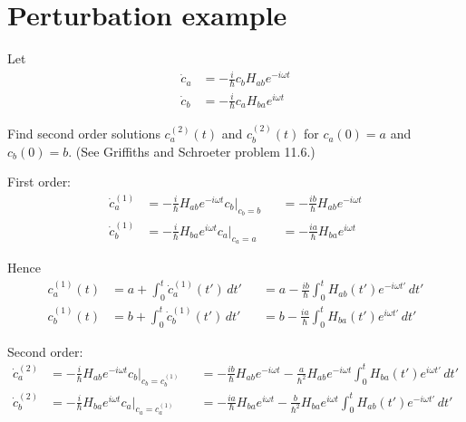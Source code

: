 

\section*{Perturbation example}

Let
\begin{equation*}
\begin{aligned}
\dot c_a&=-\frac{i}{\hbar}c_bH_{ab}e^{-i\omega t}
\\
\dot c_b&=-\frac{i}{\hbar}c_aH_{ba}e^{i\omega t}
\end{aligned}
\end{equation*}

Find second order solutions $c_a^{(2)}(t)$ and $c_b^{(2)}(t)$ for $c_a(0)=a$ and $c_b(0)=b$.
(See Griffiths and Schroeter problem 11.6.)

\bigskip
First order:
\begin{equation*}
\begin{aligned}
\dot c_a^{(1)}&=-\frac{i}{\hbar}H_{ab}e^{-i\omega t}c_b\bigg|_{c_b=b}
&&=-\frac{ib}{\hbar}H_{ab}e^{-i\omega t}
\\
\dot c_b^{(1)}&=-\frac{i}{\hbar}H_{ba}e^{i\omega t}c_a\bigg|_{c_a=a}
&&=-\frac{ia}{\hbar}H_{ba}e^{i\omega t}
\end{aligned}
\tag{1}
\end{equation*}

Hence
\begin{equation*}
\begin{aligned}
c_a^{(1)}(t)&=a+\int_0^t\dot c_a^{(1)}(t')\,dt'
&&=a-\frac{ib}{\hbar}\int_0^tH_{ab}(t')e^{-i\omega t'}\,dt'
\\
c_b^{(1)}(t)&=b+\int_0^t\dot c_b^{(1)}(t')\,dt'
&&=b-\frac{ia}{\hbar}\int_0^tH_{ba}(t')e^{i\omega t'}\,dt'
\end{aligned}
\tag{2}
\end{equation*}

Second order:
\begin{equation*}
\begin{aligned}
\dot c_a^{(2)}&=-\frac{i}{\hbar}H_{ab}e^{-i\omega t}c_b\bigg|_{c_b=c_b^{(1)}}
&&=-\frac{ib}{\hbar}H_{ab}e^{-i\omega t}-\frac{a}{\hbar^2}H_{ab}e^{-i\omega t}
\int_0^tH_{ba}(t')e^{i\omega t'}\,dt'
\\
\dot c_b^{(2)}&=-\frac{i}{\hbar}H_{ba}e^{i\omega t}c_a\bigg|_{c_a=c_a^{(1)}}
&&=-\frac{ia}{\hbar}H_{ba}e^{i\omega t}-\frac{b}{\hbar^2}H_{ba}e^{i\omega t}
\int_0^tH_{ab}(t')e^{-i\omega t'}\,dt'
\end{aligned}
\tag{3}
\end{equation*}

